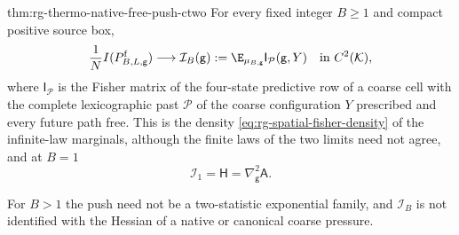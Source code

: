 {thm:rg-thermo-native-free-push-ctwo}
For every fixed integer $B\geq1$ and compact positive source box,
\begin{equation}
 \frac1N I(P^{\mathrm f}_{B,L,\mathsf g})
 \longrightarrow\mathcal I_B(\mathsf g):=
          \E_{\mu_{B,\mathsf g}}\mathsf I_{\mathcal P}(\mathsf g,Y)
 \quad\text{in }C^2(\mathcal K),
 \label{eq:rg-thermo-native-free-push-limit}
\end{equation}
where $\mathsf I_{\mathcal P}$ is the Fisher matrix of the four-state
predictive row of a coarse cell with the complete lexicographic past
$\mathcal P$ of the coarse configuration $Y$ prescribed and every future path
free. This is the density
\cref{eq:rg-spatial-fisher-density} of the infinite-law marginals, although
the finite laws of the two limits need not agree, and at $B=1$
\begin{equation}
 \mathcal I_1=\mathsf H=\nabla_{\mathsf g}^2\mathsf A.
 \label{eq:rg-thermo-native-identity-density}
\end{equation}

For $B>1$ the push need not be a two-statistic exponential family, and
$\mathcal I_B$ is not identified with the Hessian of a native or canonical
coarse pressure.

